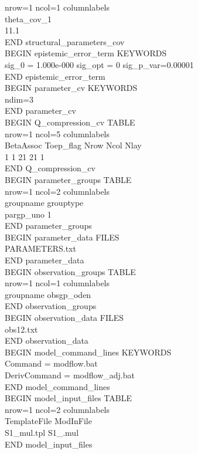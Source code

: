 \documentclass[11pt,oneside,onecolumn]{usgsreport}
\begin{document}
\begin{appendix}
\begin{bibunit}
{nrow=1 ncol=1 columnlabels \\
theta\_cov\_1 \\
11.1 \\
END structural\_parameters\_cov\\
BEGIN epistemic\_error\_term KEYWORDS \\
sig\_0 = 1.000e-000 sig\_opt = 0 sig\_p\_var=0.00001 \\
END epistemic\_error\_term\\
BEGIN parameter\_cv KEYWORDS \\
ndim=3 \\
END parameter\_cv \\
BEGIN Q\_compression\_cv TABLE\\
nrow=1 ncol=5 columnlabels \\
BetaAssoc Toep\_flag Nrow Ncol Nlay \\
1 1 21 21 1 \\
END Q\_compression\_cv\\
BEGIN parameter\_groups TABLE \\
nrow=1 ncol=2 columnlabels\\
groupname grouptype \\
pargp\_uno 1 \\
END parameter\_groups \\
BEGIN parameter\_data FILES \\
PARAMETERS.txt \\
END parameter\_data \\
BEGIN observation\_groups TABLE \\
nrow=1 ncol=1 columnlabels\\
groupname obsgp\_oden \\
END observation\_groups \\
BEGIN observation\_data FILES \\
obs12.txt \\
END observation\_data \\
BEGIN model\_command\_lines KEYWORDS \\
Command = modflow.bat \\
DerivCommand = modflow\_adj.bat \\
END model\_command\_lines \\
BEGIN model\_input\_files TABLE \\
nrow=1 ncol=2 columnlabels \\
TemplateFile ModInFile \\
S1\_mul.tpl S1\_.mul \\
END model\_input\_files \\
}
\end{bibunit}
\end{appendix}
\end{document}
